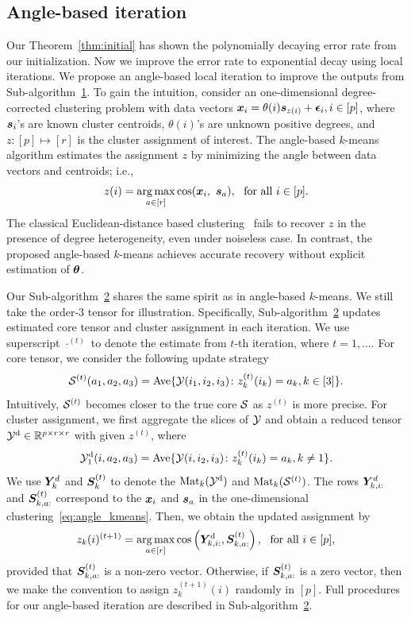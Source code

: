 \documentclass[journal]{IEEEtran}
\theoremstyle{definition}
\theoremstyle{definition}
\newcommand{\of}[1]{\left(#1\right)}
\begin{document}
\subsection{Angle-based iteration}\label{subsec:angle}
Our Theorem~\ref{thm:initial} has shown the polynomially decaying error rate from our initialization. Now we improve the error rate to exponential decay using local iterations. %
We propose an angle-based local iteration to improve the outputs from Sub-algorithm~\hyperref[alg:main]{1}. 
To gain the intuition, consider an one-dimensional degree-corrected clustering problem with data vectors $\bm x_i = \theta(i) \bm{s}_{z(i)} + \boldsymbol{\epsilon}_i, i \in [p]$, where $\bm{s}_i$'s are known cluster centroids, $\theta(i)$'s are unknown positive degrees, and $z\colon [p] \mapsto [r]$ is the cluster assignment of interest. The angle-based $k$-means algorithm estimates the assignment $z$ by minimizing the angle between data vectors and centroids; i.e., 
 \begin{equation}\label{eq:angle_kmeans}
     z(i) = \argmax_{a \in [r]} \cos ( \mx_i,\ \ms_{a} ),\ \text{ for all }i \in [p].
 \end{equation}
The classical Euclidean-distance based clustering~\citep{han2020exact} fails to recover $z$ in the presence of degree heterogeneity, even under noiseless case. In contrast, the proposed angle-based $k$-means achieves accurate recovery without explicit estimation of $\boldsymbol{\theta}$. 

Our Sub-algorithm~\hyperref[alg:main]{2} shares the same spirit as in angle-based $k$-means. We still take the order-3 tensor for illustration. Specifically, Sub-algorithm~\hyperref[alg:main]{2} updates estimated core tensor and cluster assignment in each iteration. We use superscript $\cdot^{(t)}$ to denote the estimate from $t$-th iteration, where $t=1,\ldots.$ For core tensor, we consider the following update strategy  
 \[
 \mathcal{S}^{(t)}(a_1,a_2,a_3)=\text{Ave}\{\mathcal{Y}(i_1,i_2,i_3)\colon z^{(t)}_k(i_k)=a_k, k\in[3]\}.
\]
Intuitively, $\mathcal{S}^{(t)}$ becomes closer to the true core $\mathcal{S}$ as $z^{(t)}$ is more precise. For cluster assignment, we first aggregate the slices of $\mathcal{Y}$ and obtain a reduced tensor $\mathcal{Y}^{\text{d}}\in \mathbb{R}^{p \times r \times r}$ with given $z^{(t)}$, where
\[
\mathcal{Y}^{\text{d}}_1(i,a_2,a_3)=\text{Ave}\{\mathcal{Y}(i,i_2,i_3)\colon z^{(t)}_k(i_k)=a_k, k \neq 1\}.
\]
We use $\bm Y_k^d$ and $ \bm S^{(t)}_k$ to denote the $\text{Mat}_k(\mathcal{Y}^{\text{d}})$ and $\text{Mat}_k(\mathcal{S}^{(t)})$. The rows $\bm Y^d_{k,i:}$ and $\bm S^{(t)}_{k,a:}$ correspond to the $\bm x_i$ and $\bm{s}_a$ in the one-dimensional clustering~\eqref{eq:angle_kmeans}. Then, we obtain the updated assignment by
\[
z_k(i)^{(t+1)} = \argmax_{a \in [r]} \cos \of{ \mY^{\text{d}}_{k,i:}, \mS^{(t)}_{k,a:} },\ \text{ for all } i \in [p],
\]
provided that $\bm S^{(t)}_{k,a:}$ is a non-zero vector. Otherwise, if $\bm S^{(t)}_{k,a:}$ is a zero vector, then we make the convention to assign $z^{(t+1)}_k(i)$ randomly in $[p]$. Full procedures for our angle-based iteration are described in Sub-algorithm~\hyperref[alg:main]{2}. 
\end{document}
